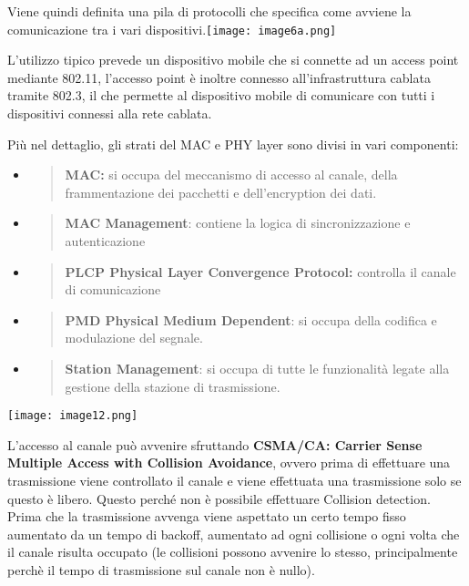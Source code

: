 Viene quindi definita una pila di protocolli che specifica come avviene
la comunicazione tra i vari
dispositivi.\texttt{[image: image6a.png]}

L'utilizzo tipico prevede un dispositivo mobile che si connette ad un
access point mediante 802.11, l'accesso point è inoltre connesso
all'infrastruttura cablata tramite 802.3, il che permette al dispositivo
mobile di comunicare con tutti i dispositivi connessi alla rete cablata.

Più nel dettaglio, gli strati del MAC e PHY layer sono divisi in vari
componenti:

\begin{itemize}
\item
  \begin{quote}
  \textbf{MAC:} si occupa del meccanismo di accesso al canale, della
  frammentazione dei pacchetti e dell'encryption dei dati.
  \end{quote}
\item
  \begin{quote}
  \textbf{MAC Management}: contiene la logica di sincronizzazione e
  autenticazione
  \end{quote}
\item
  \begin{quote}
  \textbf{PLCP Physical Layer Convergence Protocol:} controlla il canale
  di comunicazione
  \end{quote}
\item
  \begin{quote}
  \textbf{PMD Physical Medium Dependent}: si occupa della codifica e
  modulazione del segnale.
  \end{quote}
\item
  \begin{quote}
  \textbf{Station Management}: si occupa di tutte le funzionalità legate
  alla gestione della stazione di trasmissione.
  \end{quote}
\end{itemize}

\texttt{[image: image12.png]}

L'accesso al canale può avvenire sfruttando \textbf{CSMA/CA: Carrier Sense
Multiple Access with Collision Avoidance}, ovvero prima di effettuare
una trasmissione viene controllato il canale e viene effettuata una
trasmissione solo se questo è libero. Questo perché non è possibile
effettuare Collision detection. Prima che la trasmissione avvenga viene aspettato
un certo tempo fisso aumentato da un tempo di backoff, aumentato ad ogni 
collisione o ogni volta che il canale risulta occupato (le collisioni possono 
avvenire lo stesso, principalmente perchè il tempo di trasmissione sul canale 
non è nullo).

